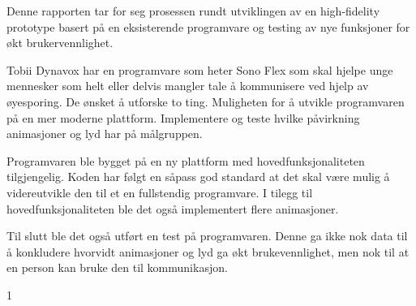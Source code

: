 
Denne rapporten tar for seg prosessen rundt utviklingen av en high-fidelity prototype basert på en eksisterende programvare og testing av nye funksjoner for økt brukervennlighet. 

Tobii Dynavox har en programvare som heter Sono Flex som skal hjelpe unge mennesker som helt eller delvis mangler tale å kommunisere ved hjelp av øyesporing. De ønsket å utforske to ting.  Muligheten for å utvikle programvaren på en mer moderne plattform. Implementere og teste hvilke påvirkning animasjoner og lyd har på målgruppen.

Programvaren ble bygget på en ny plattform med hovedfunksjonaliteten tilgjengelig. Koden har følgt en såpass god standard at det skal være mulig å videreutvikle den til et en fullstendig programvare. I tilegg til hovedfunksjonaliteten ble det også implementert flere animasjoner. 

Til slutt ble det også utført en test på programvaren. Denne ga ikke nok data til å konkludere hvorvidt animasjoner og lyd ga økt brukevennlighet, men nok til at en person kan bruke den til kommunikasjon.



1
